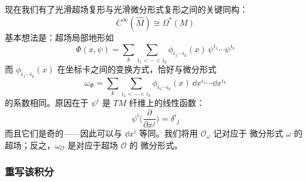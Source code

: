现在我们有了光滑超场复形与光滑微分形式复形之间的关键同构：
\begin{equation}
C^{\infty}(\widehat M)\cong \Omega^{\ast}(M)
\tag{3.9}
\end{equation}
基本想法是：超场局部地形如
\begin{equation}
\Phi(x,\psi) = \sum_{k}\sum_{i_1<\cdots<i_k}
\phi_{i_1\cdots i_k}(x)\,\psi^{i_1}\cdots\psi^{i_k}
\tag{3.10}
\end{equation}
而 $\phi_{i_1\cdots i_k}(x)$ 在坐标卡之间的变换方式，恰好与微分形式
\begin{equation}
\omega_{\Phi} = \sum_{k}\sum_{i_1<\cdots<i_k}
\phi_{i_1\cdots i_k}(x)\,\dd x^{i_1}\cdots\dd x^{i_k}
\tag{3.11}
\end{equation}
的系数相同。原因在于 $\psi^i$ 是 $TM$ 纤维上的线性函数：
\begin{equation}
\psi^i\Big(\frac{\partial}{\partial x^j}\Big) = \delta^i{}_j
\tag{3.12}
\end{equation}
而且它们是奇的——因此可以与 $\dd x^i$ 等同。我们将用 $\mathcal O_\omega$ 记对应于
微分形式 $\omega$ 的超场；反之，$\omega_{\mathcal O}$ 是对应于超场 $\mathcal O$ 的
微分形式。

\subsubsection{重写该积分}

